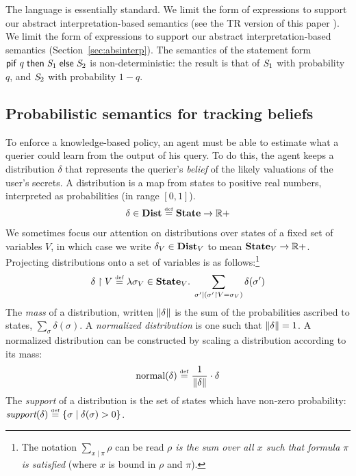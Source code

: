 The language is essentially standard. 
\ifacita
We limit the form of expressions to support our abstract
interpretation-based semantics (see the TR version of this paper \cite{TR}).
\else
We limit the form of expressions to support our abstract
interpretation-based semantics (Section~\ref{sec:absinterp}).
\fi
The semantics of the statement form $\mathsf{pif}\;{q}\;\mathsf{then}\;{\mathit{S}_1}\;\mathsf{else}\;{\mathit{S}_2}$ is
non-deterministic: the result is that of $\mathit{S}_1$ with probability
$q$, and $\mathit{S}_2$ with probability $1 - q$.

\subsection{Probabilistic semantics for tracking beliefs}
\label{sec:clarkson-semantics}

To enforce a knowledge-based policy, an agent must be able to
estimate what a querier could learn from the output of his query.  To
do this, the agent keeps a distribution $\delta$ that represents
the querier's \emph{belief} of the likely valuations of the user's
secrets.  A distribution is a map from states to positive real
numbers, interpreted as probabilities (in range $[0,1]$).
$$\begin{array}{l}
\delta \in \textbf{Dist} \stackrel{\smash{\scriptscriptstyle \mathrm{def}}}= \textbf{State} \rightarrow \mathbb{R}+
\end{array}$$
We sometimes focus our attention on distributions over
states of a fixed set of variables $V$, in which case we write
$\delta_V \in \textbf{Dist}_V$ to mean $\textbf{State}_V \rightarrow \mathbb{R}+$.
Projecting distributions onto a set of variables is as
follows:\footnote{The notation $\sum_{x \mid \pi} \rho$ can be read
  \emph{$\rho$ is the sum over all $x$ such that formula $\pi$ is
    satisfied} (where $x$ is bound in $\rho$ and $\pi$).}
\[\delta \upharpoonright V \stackrel{\smash{\scriptscriptstyle \mathrm{def}}}= \lambda \sigma_V \in \textbf{State}_V . \; \sum_{\sigma' \mid (\sigma' \upharpoonright V = \sigma_V)} \delta(\sigma')\]
The \emph{mass} of a distribution, written $ \mathord{\parallel}\delta\mathord{\parallel} $ is the sum
of the probabilities ascribed to states, $ \sum_{\sigma}
\delta(\sigma) $.  A \emph{normalized distribution} is one such that $
\mathord{\parallel}\delta\mathord{\parallel} = 1 $.  A normalized distribution can 
be constructed by scaling a distribution according to its
mass:
$$ \text{normal}(\delta) \stackrel{\smash{\scriptscriptstyle \mathrm{def}}}= \frac{1}{\mathord{\parallel}\delta\mathord{\parallel}} \cdot \delta $$
The \emph{support} of a distribution is the set of states which have
non-zero probability: $\textit{support}(\delta) \stackrel{\smash{\scriptscriptstyle \mathrm{def}}}= \{\sigma \mid
\delta(\sigma) > 0\}$.



